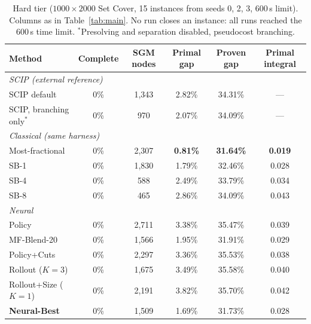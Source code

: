 \documentclass[11pt,a4paper]{article}
\begin{document}
\begin{table}[t]
\caption{Hard tier ($1000\times2000$ Set Cover, 15 instances from seeds 0, 2, 3, $600$\,s limit). Columns as in Table~\ref{tab:main}. No run closes an instance: all runs reached the 600\,s time limit. $^\ast$Presolving and separation disabled, pseudocost branching.}
\label{tab:hard}
\begin{center}
\small
\begin{tabular}{lccccc}
\toprule
Method & Complete & SGM nodes & Primal gap & Proven gap & Primal integral \\
\midrule
\multicolumn{6}{l}{\emph{SCIP (external reference)}} \\
SCIP default                 & 0\% & 1{,}343 & 2.82\% & 34.31\% & --- \\
SCIP, branching only$^\ast$  & 0\% & 970     & 2.07\% & 34.09\% & --- \\
\midrule
\multicolumn{6}{l}{\emph{Classical (same harness)}} \\
Most-fractional      & 0\% & 2{,}307 & \textbf{0.81\%} & \textbf{31.64\%} & \textbf{0.019} \\
SB-1                 & 0\% & 1{,}830 & 1.79\% & 32.46\% & 0.028 \\
SB-4                 & 0\% & 588     & 2.49\% & 33.79\% & 0.034 \\
SB-8                 & 0\% & 465     & 2.86\% & 34.09\% & 0.043 \\
\midrule
\multicolumn{6}{l}{\emph{Neural}} \\
Policy               & 0\% & 2{,}711 & 3.38\% & 35.47\% & 0.039 \\
MF-Blend-20          & 0\% & 1{,}566 & 1.95\% & 31.91\% & 0.029 \\
Policy+Cuts          & 0\% & 2{,}297 & 3.36\% & 35.53\% & 0.038 \\
Rollout ($K{=}3$)    & 0\% & 1{,}675 & 3.49\% & 35.58\% & 0.040 \\
Rollout+Size ($K{=}1$) & 0\% & 2{,}191 & 3.82\% & 35.70\% & 0.042 \\
\textbf{Neural-Best} & 0\% & 1{,}509 & 1.69\% & 31.73\% & 0.028 \\
\bottomrule
\end{tabular}
\end{center}
\end{table}
\end{document}
